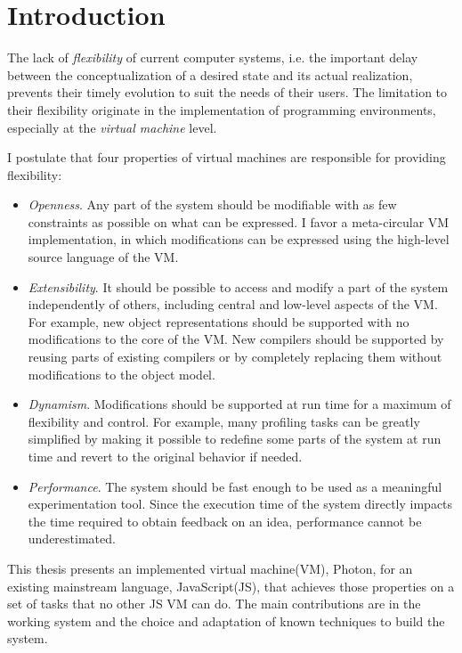 \chapter{Introduction}

The lack of \textit{flexibility} of current computer systems, i.e. the
important delay between the conceptualization of a desired state and its actual
realization, prevents their timely evolution to suit the needs of their users.
The limitation to their flexibility originate in the implementation of
programming environments, especially at the \textit{virtual machine} level.

I postulate that four properties of virtual machines are responsible for
providing flexibility:
\begin{itemize}
    \item \textit{Openness}. Any part of the system should be modifiable with
    as few constraints as possible on what can be expressed. I favor a
    meta-circular VM implementation, in which modifications can be expressed
    using the high-level source language of the VM. 

    \item \textit{Extensibility}. It should be possible to access and modify
    a part of the system independently of others, including central and low-level
    aspects of the VM. For example, new object representations should be
    supported with no modifications to the core of the VM. New compilers
    should be supported by reusing parts of existing compilers or by
    completely replacing them without modifications to the object model.

    \item \textit{Dynamism}. Modifications should be supported at run time for
    a maximum of flexibility and control. For example, many profiling tasks
    can be greatly simplified by making it possible to redefine some parts of
    the system at run time and revert to the original behavior if needed.

    \item \textit{Performance}. The system should be fast enough to be used as
    a meaningful experimentation tool. Since the execution time of the system
    directly impacts the time required to obtain feedback on an idea,
    performance cannot be underestimated.
\end{itemize}

This thesis presents an implemented virtual machine(VM), Photon, for an existing
mainstream language, JavaScript(JS), that achieves those properties on a set of
tasks that no other JS VM can do. The main contributions are in the working
system and the choice and adaptation of known techniques to build the system.

